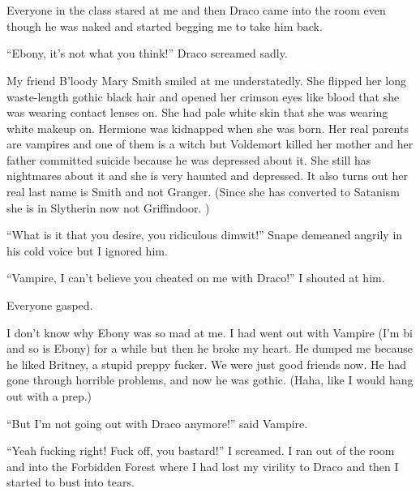 \section{\chaptername~\thesection}



Everyone in the class stared at me and then Draco came into the room even though he was naked and started begging me to take him back.

\enquote{Ebony, it's not what you think!} Draco screamed sadly.

My friend B'loody Mary Smith smiled at me understatedly. She flipped her long waste-length gothic black hair and opened her crimson eyes like blood that she was wearing contact lenses on. She had pale white skin that she was wearing white makeup on. Hermione was kidnapped when she was born. Her real parents are vampires and one of them is a witch but Voldemort killed her mother and her father committed suicide because he was depressed about it. She still has nightmares about it and she is very haunted and depressed. It also turns out her real last name is Smith and not Granger. (Since she has converted to Satanism she is in Slytherin now not Griffindoor. )

\enquote{What is it that you desire, you ridiculous dimwit!} Snape demeaned angrily in his cold voice but I ignored him.

\enquote{Vampire, I can't believe you cheated on me with Draco!} I shouted at him.

Everyone gasped.

I don't know why Ebony was so mad at me. I had went out with Vampire (I'm bi and so is Ebony) for a while but then he broke my heart. He dumped me because he liked Britney, a stupid preppy fucker. We were just good friends now. He had gone through horrible problems, and now he was gothic. (Haha, like I would hang out with a prep.)

\enquote{But I'm not going out with Draco anymore!} said Vampire.

\enquote{Yeah fucking right! Fuck off, you bastard!} I screamed. I ran out of the room and into the Forbidden Forest where I had lost my virility to Draco and then I started to bust into tears.
